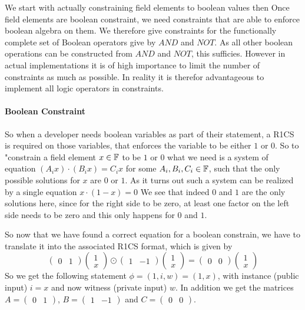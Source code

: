 We start with actually constraining field elements to boolean values then   
Once field elements are boolean constraint, we need constraints that are able to enforce boolean algebra on them. We therefore give constraints for the functionally complete set of Boolean operators give by $AND$ and $NOT$. As all other boolean operations can be constructed from $AND$ and $NOT$, this sufficies. However in actual implementations it is of high importance to limit the number of constraints as much as possible. In reality it is therefor advantageous to implement all logic operators in constraints.

\paragraph{Boolean Constraint}
So when a developer needs boolean variables as part of their statement, a R1CS is required on those variables, that enforces the variable to be either $1$ or $0$. So to "constrain a field element $x\in \mathbb{F}$ to be $1$ or $0$ what we need is a system of equation $(A_ix)\cdot (B_ix) = C_ix$ for some $A_i,B_i,C_i\in \mathbb{F}$, such that the only possible solutions for $x$ are $0$ or $1$.
As it turns out such a system can be realized by a single equation
$x \cdot (1-x) =0$
We see that indeed $0$ and $1$ are the only solutions here, since for the right side to be zero, at least one factor on the left side needs to be zero and this only happens for $0$ and $1$. 

So now that we have found a correct equation for a boolean constrain, we have to translate it into the associated R1CS format, which is given by 
$$
\begin{pmatrix}0 & 1 \end{pmatrix} \begin{pmatrix} 1 \\ x \end{pmatrix}\odot
\begin{pmatrix}1 & -1 \end{pmatrix} \begin{pmatrix} 1 \\ x \end{pmatrix} =
\begin{pmatrix}0 & 0 \end{pmatrix} \begin{pmatrix} 1 \\ x \end{pmatrix}
$$
So we get the following statement $\phi = (1,i,w) = (1, x)$, with instance (public input) $i=x$ and now witness (private input) $w$. In addition we get the matrices
$A=\begin{pmatrix}0 & 1\end{pmatrix}$, $B=\begin{pmatrix}1 & -1\end{pmatrix}$ and $C=\begin{pmatrix}0 & 0\end{pmatrix}$.

